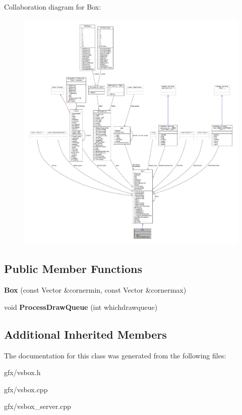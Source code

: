 Collaboration diagram for Box\+:
\nopagebreak
\begin{figure}[H]
\begin{center}
\leavevmode
\includegraphics[width=350pt]{d3/dde/classBox__coll__graph}
\end{center}
\end{figure}
\subsection*{Public Member Functions}
\begin{DoxyCompactItemize}
\item 
{\bfseries Box} (const Vector \&cornermin, const Vector \&cornermax)\hypertarget{classBox_a2b108c5136ae1db85d26c6fe12478c39}{}\label{classBox_a2b108c5136ae1db85d26c6fe12478c39}

\item 
void {\bfseries Process\+Draw\+Queue} (int whichdrawqueue)\hypertarget{classBox_a5bc97af2177830e7863dfb90a94632f9}{}\label{classBox_a5bc97af2177830e7863dfb90a94632f9}

\end{DoxyCompactItemize}
\subsection*{Additional Inherited Members}


The documentation for this class was generated from the following files\+:\begin{DoxyCompactItemize}
\item 
gfx/vsbox.\+h\item 
gfx/vsbox.\+cpp\item 
gfx/vsbox\+\_\+server.\+cpp\end{DoxyCompactItemize}

